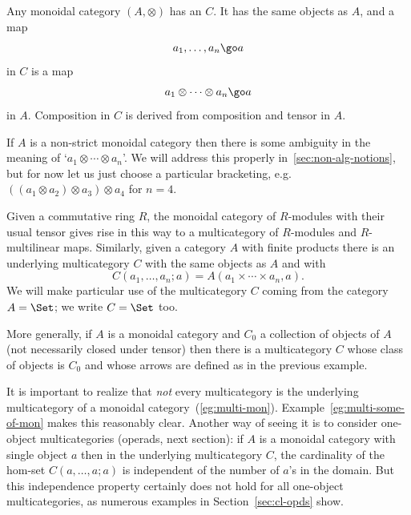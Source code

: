 \begin{example}	%
Any monoidal category $(A, \otimes)$ has an %
%
%
 $C$.  It has the same objects as $A$, and a map
\[
a_1, \ldots, a_n \go a
\]
in $C$ is a map
\[
a_1 \otimes \cdots \otimes a_n \go a
\]
in $A$.  Composition in $C$ is derived from composition and tensor in $A$.

If $A$ is a non-strict monoidal category then there is some ambiguity in
the meaning of `$a_1 \otimes\cdots\otimes a_n$'.  We will address this
properly in~\ref{sec:non-alg-notions}, but for now let us just choose
a particular bracketing, e.g.\ $((a_1 \otimes a_2) \otimes a_3) \otimes
a_4$ for $n=4$.

Given a commutative ring $R$, the monoidal category of $R$-modules%
%
%
with their usual tensor gives rise in this way to a multicategory of
$R$-modules and $R$-multilinear maps.  Similarly, given a category $A$ with
finite products there is an underlying multicategory $C$ with the same
objects as $A$ and with
\[
C(a_1, \ldots, a_n; a) = A(a_1 \times\cdots\times a_n, a).
\]
We will make particular use of the multicategory $C$ coming from the
category $A = \Set$;%
%
%
we write $C = \Set$ too.
\end{example}

\begin{example}	
More generally, if $A$ is a monoidal category and $C_0$ a collection of
objects of $A$ (not necessarily closed under tensor) then there is a
multicategory $C$ whose class of objects is $C_0$ and whose arrows are
defined as in the previous example. 
\end{example}

It is important to realize that \emph{not} every multicategory%
%
%
is the underlying%
%
%
multicategory of a monoidal
category~(\ref{eg:multi-mon}).  Example~\ref{eg:multi-some-of-mon} makes
this reasonably clear.  Another way of seeing it is to consider one-object
multicategories (operads, next section): if $A$ is a monoidal category with
single object $a$ then in the underlying multicategory $C$, the cardinality
of the hom-set $C(a, \ldots, a; a)$ is independent of the number of $a$'s
in the domain.  But this independence property certainly does not hold for
all one-object multicategories, as numerous examples in
Section~\ref{sec:cl-opds} show.



